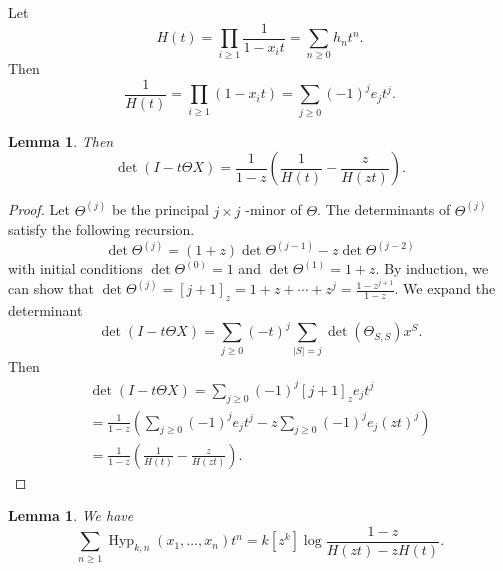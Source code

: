 \documentclass[12pt,reqno]{amsart}
\theoremstyle{plain}
\newtheorem{lemma}[theorem]{Lemma}
\theoremstyle{definition}
\DeclareMathOperator{\Hyp}{Hyp}
\begin{document}
Let
\begin{equation}
	H(t) = \prod_{i \geq 1} \frac{1}{1 - x_i t} = \sum_{n \geq 0} h_n t^n.
\end{equation}
Then
\begin{equation}
	\frac{1}{H(t)} = \prod_{i \geq 1} (1-x_i t) = \sum_{j \geq 0} (-1)^j e_j t^j.
\end{equation}

\begin{lemma}\label{lem:detI-t}
	Then
	\begin{equation}
		\det(I - t \Theta X) = \frac{1}{1-z} \left( \frac{1}{H(t)} - \frac{z}{H(zt)} \right).
	\end{equation}
\end{lemma}

\begin{proof}
	Let $ \Theta^{(j)} $ be the principal $ j \times j $ -minor of $ \Theta $. The determinants of $ \Theta^{(j)} $
	satisfy the following recursion.
	\begin{equation}
		\det \Theta^{(j)} = (1+z) \det \Theta^{(j-1)} - z \det \Theta^{(j-2)}
	\end{equation}
	with initial conditions $
		\det \Theta^{(0)} = 1 $ and $
		\det \Theta^{(1)} = 1+z $.
	By induction, we can show that $
		\det \Theta^{(j)} = [j+1]_z = 1 + z + \cdots + z^j = \frac{1 - z^{j+1}}{1-z} $.
	We expand the determinant
	\begin{equation}
		\det(I - t\Theta X) = \sum_{j \geq 0} (-t)^j \sum_{|S|=j} \det(\Theta_{S,S}) x^S.
	\end{equation}
	Then
	\begin{multline}
		\det(I - t\Theta X) = \sum_{j \geq 0} (-1)^j [j+1]_z e_j t^j \\= \frac{1}{1-z} \left( \sum_{j \geq 0} (-1)^j e_j t^j - z \sum_{j \geq 0} (-1)^j e_j (zt)^j \right) \\= \frac{1}{1-z}\left(\frac{1}{H(t)} - \frac{z}{H(zt)}\right).
	\end{multline}
\end{proof}

\begin{lemma}
	We have
	\begin{equation}
		\sum_{n \geq 1} \Hyp_{k,n}(x_1,\dots,x_n)t^n = k [z^k] \log \frac{1-z}{H(zt) - z H(t)}.
	\end{equation}
\end{lemma}
\end{document}
